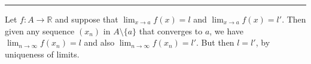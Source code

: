 \documentclass[letterpaper,10pt,english]{jupyterBook}
\begin{document}
\bigskip\hrule\bigskip


\sphinxAtStartPar
{\hyperref[\detokenize{Problems:id6}]{}} Let \(f:A\to \mathbb{R}\) and suppose that \(\lim_{x \rightarrow a} f(x) = l\) and \(\lim_{x \rightarrow a} f(x) = l'\). Then given any sequence \((x_{n})\) in \(A \setminus \{a\}\) that converges to \(a\), we have \(\lim_{n\rightarrow\infty} f(x_{n}) = l\) and also \(\lim_{n\rightarrow\infty} f(x_{n}) = l'\). But then \(l = l'\), by uniqueness of limits.







\renewcommand{\indexname}{Index}
\printindex
\end{document}

